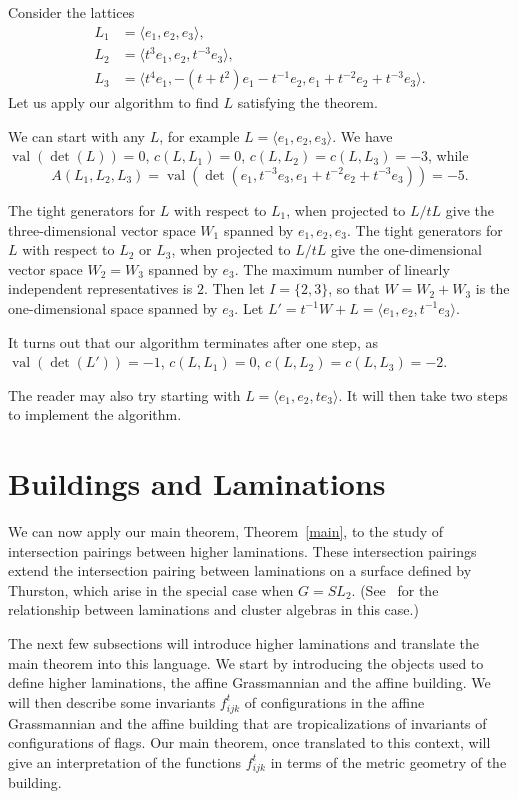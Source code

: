 \documentclass[ALCO,ThmDefs,Unicode,epreuves]{cedram}
\newcommand{\val}{\operatorname{val}}
\begin{document}
\begin{example} Consider the lattices 
\begin{align*}
L_1&=\langle e_1, e_2, e_3\rangle ,
\\
L_2&=\langle t^3e_1, e_2, t^{-3}e_3\rangle ,
\\
L_3&=\langle t^4e_1, -(t+t^2)e_1-t^{-1}e_2, e_1+ t^{-2}e_2+t^{-3}e_3\rangle .
\end{align*}
Let us apply our algorithm to find $L$ satisfying the theorem.

We can start with any $L$, for example $L=\langle e_1, e_2, e_3\rangle .$ We have $\val(\det(L))=0$, $c(L,L_1)=0$, $c(L,L_2)=c(L,L_3)=-3$, while 
\[
A(L_1, L_2, L_3)=\val(\det(e_1, t^{-3}e_3, e_1+ t^{-2}e_2+t^{-3}e_3)) = -5.
\]

The tight generators for $L$ with respect to $L_1$, when projected to $L/tL$ give the three-dimensional vector space $W_1$ spanned by $e_1, e_2, e_3$. The tight generators for $L$ with respect to $L_2$ or $L_3$, when projected to $L/tL$ give the one-dimensional vector space $W_2=W_3$ spanned by $e_3$. The maximum number of linearly independent representatives is $2$. Then let $I = \{2, 3\}$, so that $W=W_2+W_3$ is the one-dimensional space spanned by $e_3$. Let $L'=t^{-1}W+L=\langle e_1, e_2, t^{-1}e_3\rangle .$

It turns out that our algorithm terminates after one step, as $\val(\det(L'))=-1$, $c(L,L_1)=0$, $c(L,L_2)=c(L,L_3)=-2$.

The reader may also try starting with $L=\langle e_1, e_2, te_3\rangle $. It will then take two steps to implement the algorithm.

\end{example}

\section{Buildings and Laminations}\label{sect5}

We can now apply our main theorem, Theorem~\ref{main}, to the study of intersection pairings between higher laminations. These intersection pairings extend the intersection pairing between laminations on a surface defined by Thurston, which arise in the special case when $G=SL_2$. (See~\cite{FST} for the relationship between laminations and cluster algebras in this case.)

The next few subsections will introduce higher laminations and translate the main theorem into this language. We start by introducing the objects used to define higher laminations, the affine Grassmannian and the affine building. We will then describe some invariants $f_{ijk}^t$ of configurations in the affine Grassmannian and the affine building that are tropicalizations of invariants of configurations of flags. Our main theorem, once translated to this context, will give an interpretation of the functions $f_{ijk}^t$ in terms of the metric geometry of the building.
\end{document}
